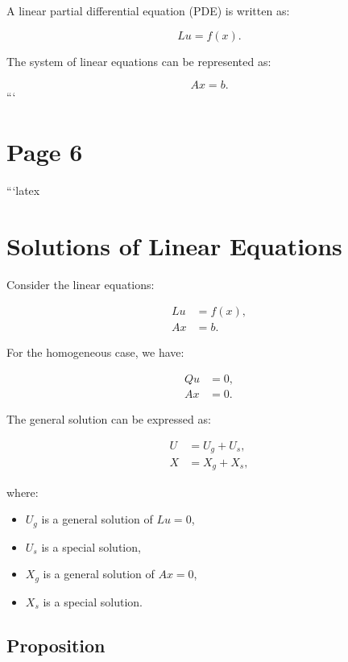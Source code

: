 \documentclass[11pt]{article}
\begin{document}
A linear partial differential equation (PDE) is written as:

\begin{equation}
    Lu = f(x).
\end{equation}

The system of linear equations can be represented as:

\begin{equation}
    Ax = b.
\end{equation}
```
\clearpage
\section*{Page 6}

```latex
\section*{Solutions of Linear Equations}

Consider the linear equations:

\begin{align}
    Lu &= f(x), \\
    Ax &= b.
\end{align}

For the homogeneous case, we have:

\begin{align}
    Qu &= 0, \\
    Ax &= 0.
\end{align}

The general solution can be expressed as:

\begin{align}
    U &= U_g + U_s, \\
    X &= X_g + X_s,
\end{align}

where:
\begin{itemize}
    \item $U_g$ is a general solution of $Lu = 0$,
    \item $U_s$ is a special solution,
    \item $X_g$ is a general solution of $Ax = 0$,
    \item $X_s$ is a special solution.
\end{itemize}

\subsection*{Proposition}
\end{document}
